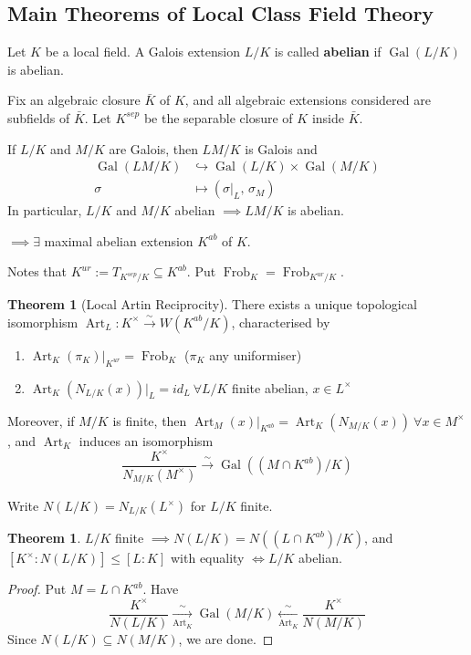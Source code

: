 \documentclass[a4paper]{article}
\theoremstyle{definition}
\theoremstyle{default}
\newtheorem{theorem}[definition]{Theorem}
\theoremstyle{remark}
\DeclareMathOperator{\Gal}{Gal}
\DeclareMathOperator{\Frob}{Frob}
\DeclareMathOperator{\Art}{Art}
\begin{document}
\subsection{Main Theorems of Local Class Field Theory}
Let $K$ be a local field.
A Galois extension $L/K$ is called \textbf{abelian} if $\Gal(L/K)$ is abelian.

Fix an algebraic closure $\bar{K}$ of $K$,
and all algebraic extensions considered are subfields of $\bar{K}$.
Let $K^{sep}$ be the separable closure of $K$ inside $\bar{K}$.

If $L/K$ and $M/K$ are Galois,
then $LM/K$ is Galois and
\begin{align*}
	\Gal(LM/K) &\hookrightarrow \Gal(L/K) \times \Gal(M/K) \\
	\sigma &\mapsto (\sigma|_L,\, \sigma_M)
\end{align*}
In particular, $L/K$ and $M/K$ abelian $\implies LM/K$ is abelian.

$\implies \exists$ maximal abelian extension $K^{ab}$ of $K$.

Notes that $K^{ur} := T_{K^{sep}/K} \subseteq K^{ab}$. Put $\Frob_K = \Frob_{K^{ur}/K}$.

\begin{theorem}[Local Artin Reciprocity]
	There exists a unique topological isomorphism $\Art_L : K^\times \overset{\sim}{\longrightarrow} W(K^{ab}/K)$, characterised by
	\begin{enumerate}
		\item $\Art_K(\pi_K)|_{K^{ur}} = \Frob_K$ ($\pi_K$ any uniformiser)
		\item $\Art_K(N_{L/K}(x))|_L = id_L\ \forall L/K$ finite abelian, $x \in L^\times$
	\end{enumerate}
	Moreover, if $M/K$ is finite, then $\Art_M(x)|_{K^{ab}} = \Art_K(N_{M/K}(x))\ \forall x \in M^\times$,
	and $\Art_K$ induces an isomorphism
	$$\frac{K^\times}{N_{M/K}(M^\times)} \overset{\sim}{\longrightarrow} \Gal((M \cap K^{ab})/K)$$
	\label{103}
\end{theorem}

Write $N(L/K) = N_{L/K}(L^\times)$ for $L/K$ finite.

\begin{theorem}
	$L/K$ finite $\implies N(L/K) = N((L \cap K^{ab})/K)$,
	and $[K^\times:N(L/K)] \leq [L:K]$
	with equality $\iff L/K$ abelian.
	\label{104}
\end{theorem}

\begin{proof}
	Put $M=L \cap K^{ab}$. Have
	$$\frac{K^\times}{N(L/K)} \underset{\Art_K}{\overset{\sim}{\longrightarrow}} \Gal(M/K) \underset{\Art_K}{\overset{\sim}{\longleftarrow}} \frac{K^\times}{N(M/K)}$$
	Since $N(L/K) \subseteq N(M/K)$, we are done.
\end{proof}
\end{document}
